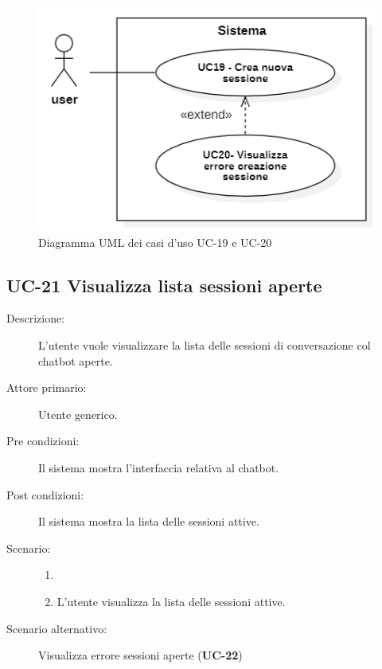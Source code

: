 \begin{figure}[H]
    \centering
    \includegraphics[width=0.8\linewidth]{UC19-20.png} %
    \caption{Diagramma UML dei casi d'uso UC-19 e UC-20}
    \label{fig:UC22-23}
\end{figure}

\subsection{UC-21 Visualizza lista sessioni aperte}
\begin{description}
    \item[Descrizione:] L'utente vuole visualizzare la lista delle sessioni di conversazione col chatbot aperte.
    \item[Attore primario:] Utente generico.
    \item[Pre condizioni:] Il sistema mostra l'interfaccia relativa al chatbot.
    \item[Post condizioni:] Il sistema mostra la lista delle sessioni attive.
    \item[Scenario:]
    \begin{enumerate}
        \item[]
        \item L'utente visualizza la lista delle sessioni attive.
    \end{enumerate}
    \item[Scenario alternativo:] Visualizza errore sessioni aperte (\textbf{UC-22})
\end{description}

